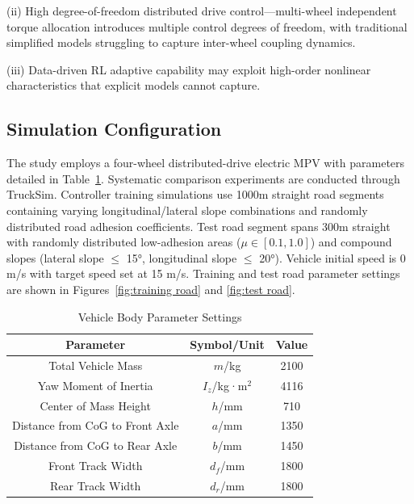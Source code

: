 \documentclass[journal]{IEEEtran}
\begin{document}
	(ii) High degree-of-freedom distributed drive control—multi-wheel independent torque allocation introduces multiple control degrees of freedom, with traditional simplified models struggling to capture inter-wheel coupling dynamics.
	
	(iii) Data-driven RL adaptive capability may exploit high-order nonlinear characteristics that explicit models cannot capture.
	
	\subsection{Simulation Configuration}
	
	The study employs a four-wheel distributed-drive electric MPV with parameters detailed in Table~\ref{tab:vehicle_params}. Systematic comparison experiments are conducted through TruckSim. Controller training simulations use 1000m straight road segments containing varying longitudinal/lateral slope combinations and randomly distributed road adhesion coefficients. Test road segment spans 300m straight with randomly distributed low-adhesion areas ($\mu \in [0.1, 1.0]$) and compound slopes (lateral slope $\leq$ 15°, longitudinal slope $\leq$ 20°). Vehicle initial speed is 0 m/s with target speed set at 15 m/s. Training and test road parameter settings are shown in Figures~\ref{fig:training road} and \ref{fig:test road}.
	
	\begin{table}[!t]
		\renewcommand{\arraystretch}{1.3}
		\captionsetup{font=footnotesize, labelfont=footnotesize}
		\caption{Vehicle Body Parameter Settings}
		\label{tab:vehicle_params}
		\centering
		\footnotesize
		\begin{tabular}{ccc}
			\toprule
			\textbf{Parameter} & \textbf{Symbol/Unit} & \textbf{Value} \\
			\midrule
			Total Vehicle Mass & $m$/kg & 2100 \\
			Yaw Moment of Inertia & $I_z$/kg·m$^2$ & 4116 \\
			Center of Mass Height & $h$/mm & 710 \\
			Distance from CoG to Front Axle & $a$/mm & 1350 \\
			Distance from CoG to Rear Axle & $b$/mm & 1450 \\
			Front Track Width & $d_f$/mm & 1800 \\
			Rear Track Width & $d_r$/mm & 1800 \\
			\bottomrule
		\end{tabular}
	\end{table}
	
\end{document}
